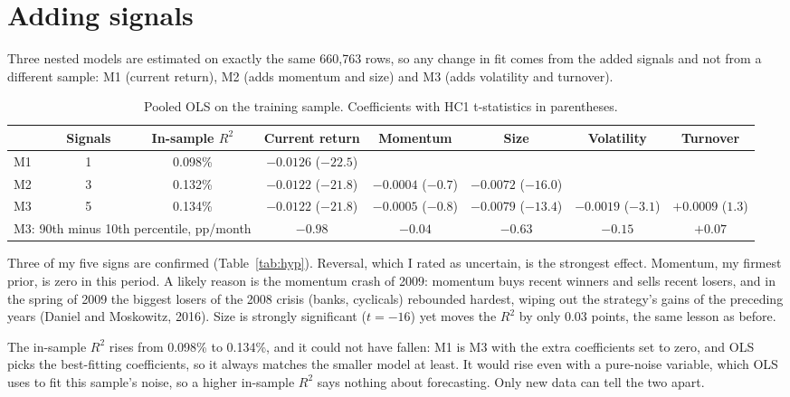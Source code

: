 \documentclass[10pt,a4paper]{article}
\begin{document}
\section{Adding signals}
\label{sec:rich}

Three nested models are estimated on exactly the same 660,763 rows, so any change in fit comes from the added
signals and not from a different sample: M1 (current return), M2 (adds momentum and size) and M3 (adds volatility
and turnover).

\begin{table}[h]
\centering\footnotesize\setlength{\tabcolsep}{3.5pt}
\begin{tabular}{lccccccc}
\toprule
& Signals & In-sample $R^2$ & Current return & Momentum & Size & Volatility & Turnover \\
\midrule
M1 & 1 & 0.098\% & $-0.0126$ ($-22.5$) & & & & \\
M2 & 3 & 0.132\% & $-0.0122$ ($-21.8$) & $-0.0004$ ($-0.7$) & $-0.0072$ ($-16.0$) & & \\
M3 & 5 & 0.134\% & $-0.0122$ ($-21.8$) & $-0.0005$ ($-0.8$) & $-0.0079$ ($-13.4$) & $-0.0019$ ($-3.1$) & $+0.0009$ ($1.3$) \\
\midrule
\multicolumn{3}{l}{M3: 90th minus 10th percentile, pp/month} & $-0.98$ & $-0.04$ & $-0.63$ & $-0.15$ & $+0.07$ \\
\bottomrule
\end{tabular}
\caption{Pooled OLS on the training sample. Coefficients with HC1 t-statistics in parentheses.}
\label{tab:rich}
\end{table}

Three of my five signs are confirmed (Table~\ref{tab:hyp}). Reversal, which I rated as uncertain, is the strongest
effect. Momentum, my firmest prior, is zero in this period. A likely reason is the momentum crash of 2009: momentum
buys recent winners and sells recent losers, and in the spring of 2009 the biggest losers of the 2008 crisis
(banks, cyclicals) rebounded hardest, wiping out the strategy's gains of the preceding years (Daniel and Moskowitz,
2016). Size is strongly significant ($t=-16$) yet moves the $R^2$ by only 0.03 points, the same lesson as before.

The in-sample $R^2$ rises from 0.098\% to 0.134\%, and it could not have fallen: M1 is M3 with the extra
coefficients set to zero, and OLS picks the best-fitting coefficients, so it always matches the smaller model at
least. It would rise even with a pure-noise variable, which OLS uses to fit this sample's noise, so a higher
in-sample $R^2$ says nothing about forecasting. Only new data can tell the two apart.
\end{document}
